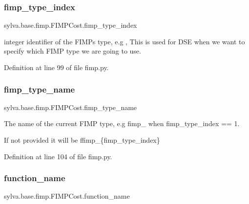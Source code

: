\subsubsection{\texorpdfstring{fimp\+\_\+type\+\_\+index}{fimp\_type\_index}}
{\footnotesize\ttfamily sylva.\+base.\+fimp.\+F\+I\+M\+P\+Cost.\+fimp\+\_\+type\+\_\+index}



integer identifier of the F\+I\+MP\textquotesingle{}s type, e.\+g {}, This is used for D\+SE when we want to specify which F\+I\+MP type we are going to use. 



Definition at line 99 of file fimp.\+py.

\mbox{\label{classsylva_1_1base_1_1fimp_1_1_f_i_m_p_cost_a0e3a5e51b56d03f44bf36db9280ca535}} 
\subsubsection{\texorpdfstring{fimp\+\_\+type\+\_\+name}{fimp\_type\_name}}
{\footnotesize\ttfamily sylva.\+base.\+fimp.\+F\+I\+M\+P\+Cost.\+fimp\+\_\+type\+\_\+name}



The name of the current F\+I\+MP type, e.\+g {\ttfamily fimp\+\_} when {\ttfamily fimp\+\_\+type\+\_\+index == 1}. 

If not provided it will be {\ttfamily f\textquotesingle{}fimp\+\_\+\{fimp\+\_\+type\+\_\+index\}\textquotesingle{}} 

Definition at line 104 of file fimp.\+py.

\mbox{\label{classsylva_1_1base_1_1fimp_1_1_f_i_m_p_cost_afb919056ee51978896f0132907a50933}} 
\subsubsection{\texorpdfstring{function\+\_\+name}{function\_name}}
{\footnotesize\ttfamily sylva.\+base.\+fimp.\+F\+I\+M\+P\+Cost.\+function\+\_\+name}



